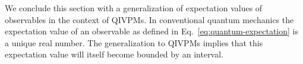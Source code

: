 \documentclass[english,reprint, aps, prl,superscriptaddress, showpacs,
showkeys, longbibliography, amsmath, amssymb, floatfix]{revtex4-1}
\theoremstyle{plain}
\theoremstyle{definition}
\newcommand{\Hilb}{\mathcal{H}}
\newcommand{\events}{\ensuremath{\mathcal{E}}}
\newcommand{\interval}[1]{{\normalfont\textsf{\textbf{#1}}}}
\newcommand{\imposs}{\interval{F}}
\newcommand{\necess}{\interval{T}}
\newcommand{\unknown}{\interval{U}}
\newcommand{\proj}[1]{\op{#1}{#1}}
\newcommand{\coreBorn}{\ensuremath{\overline{\Hilb}}}
\begin{document}

We conclude this section with a generalization of expectation values
of observables in the context of QIVPMs. In conventional quantum
mechanics the expectation value of an observable as defined in
Eq.~\eqref{eq:quantum-expectation} is a unique real number. The
generalization to QIVPMs implies that this expectation value will
itself become bounded by an interval. 
\end{document}
